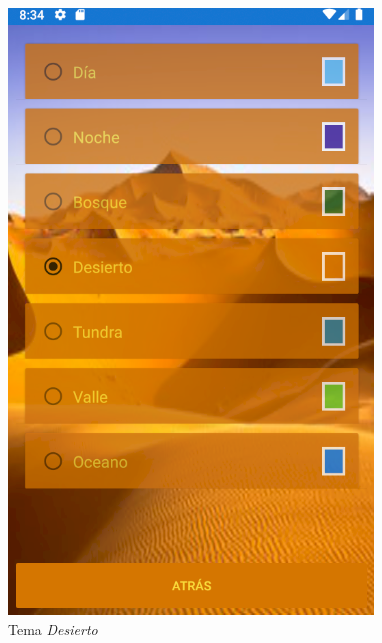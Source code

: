 \begin{figure}[H]
    \centering
    \includegraphics[scale=0.3]{Figures/Capturas/TemaDesierto.png}
    \caption{Tema \textit{Desierto}}
    \label{Desierto}    
\end{figure}
